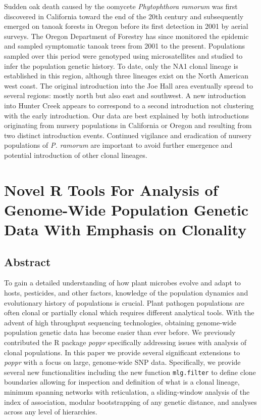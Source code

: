 \documentclass[double,12pt]{beavtex}
\begin{document}
  Sudden oak death caused by the oomycete \emph{Phytophthora ramorum} was
  first discovered in California toward the end of the 20th century and
  subsequently emerged on tanoak forests in Oregon before its first
  detection in 2001 by aerial surveys. The Oregon Department of Forestry
  has since monitored the epidemic and sampled symptomatic tanoak trees
  from 2001 to the present. Populations sampled over this period were
  genotyped using microsatellites and studied to infer the population
  genetic history. To date, only the NA1 clonal lineage is established in
  this region, although three lineages exist on the North American west
  coast. The original introduction into the Joe Hall area eventually
  spread to several regions: mostly north but also east and southwest. A
  new introduction into Hunter Creek appears to correspond to a second
  introduction not clustering with the early introduction. Our data are
  best explained by both introductions originating from nursery
  populations in California or Oregon and resulting from two distinct
  introduction events. Continued vigilance and eradication of nursery
  populations of \emph{P. ramorum} are important to avoid further
  emergence and potential introduction of other clonal lineages.
  
  \chapter{Novel R Tools For Analysis of Genome-Wide Population Genetic
  Data With Emphasis on
  Clonality}\label{novel-r-tools-for-analysis-of-genome-wide-population-genetic-data-with-emphasis-on-clonality}
  
  \section{Abstract}\label{abstract-2}
  
  To gain a detailed understanding of how plant microbes evolve and adapt
  to hosts, pesticides, and other factors, knowledge of the population
  dynamics and evolutionary history of populations is crucial. Plant
  pathogen populations are often clonal or partially clonal which requires
  different analytical tools. With the advent of high throughput
  sequencing technologies, obtaining genome-wide population genetic data
  has become easier than ever before. We previously contributed the R
  package \emph{poppr} specifically addressing issues with analysis of
  clonal populations. In this paper we provide several significant
  extensions to \emph{poppr} with a focus on large, genome-wide SNP data.
  Specifically, we provide several new functionalities including the new
  function \texttt{mlg.filter} to define clone boundaries allowing for
  inspection and definition of what is a clonal lineage, minimum spanning
  networks with reticulation, a sliding-window analysis of the index of
  association, modular bootstrapping of any genetic distance, and analyses
  across any level of hierarchies.
  
\end{document}
